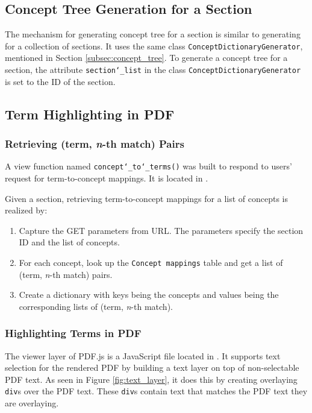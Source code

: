 \subsection{Concept Tree Generation for a Section}
The mechanism for generating concept tree for a section is similar to generating for a collection of sections. It uses the same class \texttt{ConceptDictionaryGenerator}, mentioned in Section \ref{subsec:concept_tree}. To generate a concept tree for a section, the attribute \texttt{section\char`_list} in the class \texttt{ConceptDictionaryGenerator} is set to the ID of the section.

\subsection{Term Highlighting in PDF}
\subsubsection{Retrieving (term, \textit{n}-th match) Pairs}
A view function named \texttt{concept\char`_to\char`_terms()} was built to respond to users' request for term-to-concept mappings. It is located in .

Given a section, retrieving term-to-concept mappings for a list of concepts is realized by:
\begin{enumerate}
\item Capture the GET parameters from URL. The parameters specify the section ID and the list of concepts.
\item For each concept, look up the \texttt{Concept mappings} table and get a list of (term, \textit{n}-th match) pairs.
\item Create a dictionary with keys being the concepts and values being the corresponding lists of (term, \textit{n}-th match).
\end{enumerate}


\subsubsection{Highlighting Terms in PDF}
The viewer layer of PDF.js is a JavaScript file located in . It supports text selection for the rendered PDF by building a text layer on top of non-selectable PDF text. As seen in Figure \ref{fig:text_layer}, it does this by creating overlaying \texttt{div}s over the PDF text. These \texttt{div}s contain text that matches the PDF text they are overlaying.

